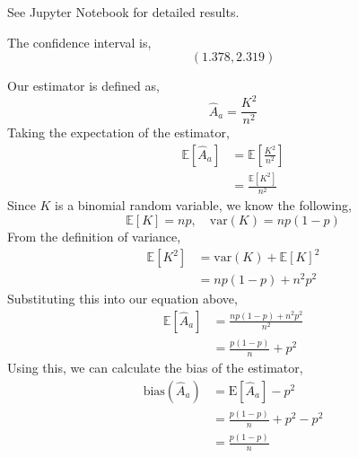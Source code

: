 \documentclass[12pt,twoside]{article}
\begin{document}
\begin{problems}
\begin{problemparts}
See Jupyter Notebook for detailed results.

The confidence interval is,
$$ \boxed{\left(1.378, 2.319\right)} $$

\end{problemparts}

\newpage
\problem  %

\begin{problemparts}

\problempart %

Our estimator is defined as,
$$ \hat{A}_a = \frac{K^2}{n^2} $$
Taking the expectation of the estimator,
\begin{align*}
    \mathbb{E}[\hat{A}_a] &= \mathbb{E}\left[\frac{K^2}{n^2}\right] \\
    &= \frac{\mathbb{E}[K^2]}{n^2}
\end{align*}
Since $K$ is a binomial random variable, we know the following,
$$ \mathbb{E}[K] = np,\quad \mathrm{var}(K) = np(1 - p) $$
From the definition of variance,
\begin{align*}
    \mathbb{E}[K^2] &= \mathrm{var}(K) + \mathbb{E}[K]^2 \\
    &= np(1 - p) + n^2 p^2
\end{align*}
Substituting this into our equation above,
\begin{align*}
    \mathbb{E}[\hat{A}_a] &= \frac{np(1 - p) + n^2 p^2}{n^2} \\
    &= \boxed{\frac{p(1 - p)}{n} + p^2}
\end{align*}
Using this, we can calculate the bias of the estimator,
\begin{align*}
    \mathrm{bias}(\hat{A}_a) &= \mathrm{E}[\hat{A}_a] - p^2 \\
    &= \frac{p(1 - p)}{n} + p^2 - p^2 \\
    &= \boxed{\frac{p(1 - p)}{n}}
\end{align*}

\problempart %


\end{problemparts}
\end{problems}
\end{document}
